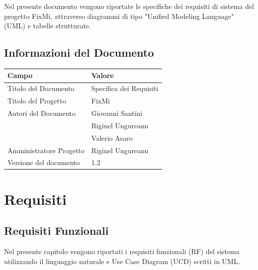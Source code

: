 \documentclass{report}
\begin{document}
	Nel presente documento vengono riportate le specifiche dei requisiti di sistema del progetto FixMi,  attraverso diagrammi di tipo "Unified Modeling Language" (UML) e tabelle strutturate.\\
	
	
	
	\section{Informazioni del Documento}
	
	\begin{center} %
		\centering
		\begin{tabular}{ |p{4cm}|p{4cm}|  }
			\hline
			\centering Campo & \qquad\qquad Valore \\ %
			\hline
			Titolo del Documento & Specifica dei Requisiti \\
			\hline
			Titolo del Progetto & FixMi \\
			\hline
			Autori del Documento &
			Giovanni Santini \\ & Riginel Ungureanu \\ & Valerio Asaro \\
			\hline
			Amministratore Progetto & Riginel Ungureanu\\
			\hline
			Versione del documento & 1.2 \\
			\hline
		\end{tabular}
	\end{center}


\chapter{Requisiti}

	
\section{Requisiti Funzionali}
Nel presente capitolo vengono riportati i requisiti funzionali (RF) del sistema utilizzando il linguaggio naturale e Use Case Diagram (UCD) scritti in UML.
\end{document}
